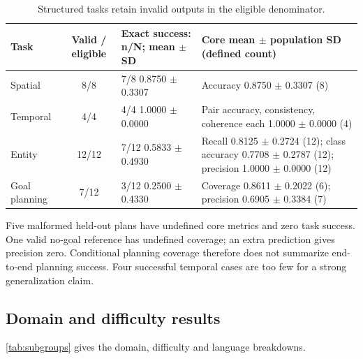 \documentclass{amsart}
\theoremstyle{definition}
\numberwithin{equation}{section}
\begin{document}
\begin{table}[htbp]
\centering\small

\caption{Structured tasks retain invalid outputs in the eligible denominator.}
\label{tab:structured}
\begin{tabularx}{\linewidth}{@{}p{.12\linewidth}c>{\raggedright\arraybackslash}p{.20\linewidth}X@{}}
\toprule
\textbf{Task} & \textbf{Valid / eligible} & \textbf{Exact success: n/N; mean \(\pm\) SD} & \textbf{Core mean \(\pm\) population SD (defined count)} \\
\midrule
Spatial & 8/8 & \shortstack{7/8\\0.8750 \(\pm\) 0.3307} & Accuracy 0.8750 \(\pm\) 0.3307 (8) \\
Temporal & 4/4 & \shortstack{4/4\\1.0000 \(\pm\) 0.0000} & Pair accuracy, consistency, coherence each 1.0000 \(\pm\) 0.0000 (4) \\
Entity & 12/12 & \shortstack{7/12\\0.5833 \(\pm\) 0.4930} & Recall 0.8125 \(\pm\) 0.2724 (12); class accuracy 0.7708 \(\pm\) 0.2787 (12); precision 1.0000 \(\pm\) 0.0000 (12) \\
Goal planning & 7/12 & \shortstack{3/12\\0.2500 \(\pm\) 0.4330} & Coverage 0.8611 \(\pm\) 0.2022 (6); precision 0.6905 \(\pm\) 0.3384 (7) \\
\bottomrule
\end{tabularx}
\end{table}
Five malformed held-out plans have undefined core metrics and zero task success. One valid no-goal reference has undefined coverage; an extra prediction gives precision zero. Conditional planning coverage therefore does not summarize end-to-end planning success. Four successful temporal cases are too few for a strong generalization claim.

\subsection{Domain and difficulty results}
\autoref{tab:subgroups} gives the domain, difficulty and language breakdowns.
\end{document}
